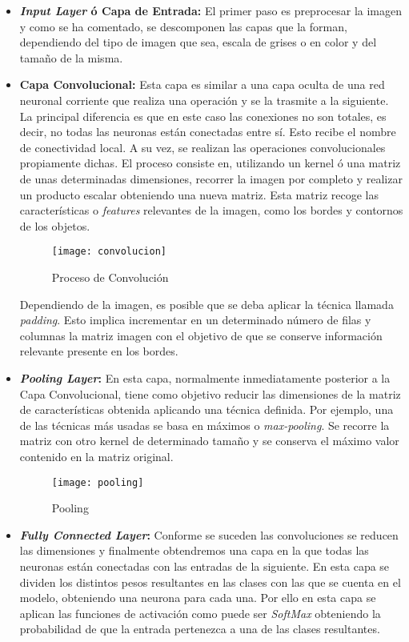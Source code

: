 \begin{itemize}
    \item \textbf{\emph{Input Layer} ó Capa de Entrada:} El primer paso es preprocesar la imagen y como se ha comentado, se descomponen las capas que la forman, dependiendo del tipo de imagen que sea, escala de grises o en color y del tamaño de la misma.
    \item \textbf{Capa Convolucional:} Esta capa es similar a una capa oculta de una red neuronal corriente que realiza una operación y se la trasmite a la siguiente. La principal diferencia es que en este caso las conexiones no son totales, es decir, no todas las neuronas están conectadas entre sí. Esto recibe el nombre de conectividad local. 
    A su vez, se realizan las operaciones convolucionales propiamente dichas. El proceso consiste en, utilizando un kernel ó una matriz de unas determinadas dimensiones, recorrer la imagen por completo y realizar un producto escalar obteniendo una nueva matriz.
    Esta matriz recoge las características o \emph{features} relevantes de la imagen, como los bordes y contornos de los objetos.
    
    \begin{figure}[htb]
	\centering
	\texttt{[image: convolucion]}
	\caption[Proceso de Convolución]{Proceso de Convolución \cite{cnn:convolucion}}
    \end{figure}
    
    Dependiendo de la imagen, es posible que se deba aplicar la técnica llamada \emph{padding}. Esto implica incrementar en un determinado número de filas y columnas la matriz imagen con el objetivo de que se conserve información relevante presente en los bordes.
    
    \item \textbf{\emph{Pooling Layer}:} En esta capa, normalmente inmediatamente posterior a la Capa Convolucional, tiene como objetivo reducir las dimensiones de la matriz de características obtenida aplicando una técnica definida. Por ejemplo, una de las técnicas más usadas se basa en máximos o \emph{max-pooling}. Se recorre la matriz con otro kernel de determinado tamaño  y se conserva el máximo valor contenido en la matriz original.
    
    \begin{figure}[htb]
	\centering
	\texttt{[image: pooling]}
	\caption[Pooling]{Pooling \cite{cnn:pooling}}
    \end{figure}
    
    \item \textbf{\emph{Fully Connected Layer}:} Conforme se suceden las convoluciones se reducen las dimensiones y finalmente obtendremos una capa en la que todas las neuronas están conectadas con las entradas de la siguiente. En esta capa se dividen los distintos pesos resultantes en las clases con las que se cuenta en el modelo, obteniendo una neurona para cada una. Por ello en esta capa se aplican las funciones de activación como puede ser \emph{SoftMax} obteniendo la probabilidad de que la entrada pertenezca a una de las clases resultantes.\cite{10.3389/frai.2020.00004}
    
\end{itemize}

